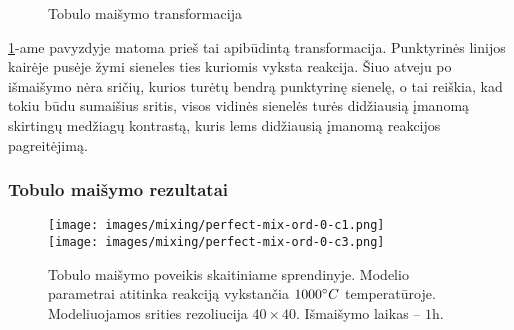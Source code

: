 \begin{figure}[!h]
\centering
{}
\caption{Tobulo maišymo transformacija}
\label{perfect-2x2-mix}
\end{figure}
\ref{perfect-2x2-mix}-ame pavyzdyje matoma prieš tai apibūdintą transformacija. Punktyrinės linijos kairėje pusėje žymi sieneles ties kuriomis vyksta reakcija. Šiuo atveju po išmaišymo nėra sričių, kurios turėtų bendrą punktyrinę sienelę, o tai reiškia, kad tokiu būdu sumaišius sritis, visos vidinės sienelės turės didžiausią įmanomą skirtingų medžiagų kontrastą, kuris lems didžiausią įmanomą reakcijos pagreitėjimą.

\subsubsection*{Tobulo maišymo rezultatai}

\begin{figure}[h!]
  \centering
  \texttt{[image: images/mixing/perfect-mix-ord-0-c1.png]} \\ 
  \texttt{[image: images/mixing/perfect-mix-ord-0-c3.png]}
  \caption{Tobulo maišymo poveikis skaitiniame sprendinyje. Modelio parametrai atitinka reakciją vykstančia $1000\degree C$ temperatūroje. Modeliuojamos srities rezoliucija $40\times40$. Išmaišymo laikas -- $1\text{h}. $}
  \label{fig:perfect-mix-small-example}
\end{figure}

